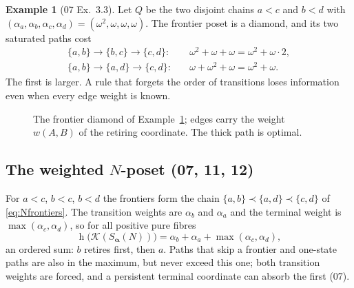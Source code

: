 \documentclass[11pt,a4paper]{article}
\theoremstyle{definition}
\newtheorem{example}[theorem]{Example}
\theoremstyle{remark}
\newcommand{\K}{\mathcal K}
\newcommand{\hgt}{\operatorname{h}}
\begin{document}
\begin{example}[07 Ex.~3.3]\label{nh:ex:diamond}
Let $Q$ be the two disjoint chains $a<c$ and $b<d$ with
$(\alpha_a,\alpha_b,\alpha_c,\alpha_d)=(\omega^2,\omega,\omega,\omega)$. The
frontier poset is a diamond, and its two saturated paths cost
\[
 \begin{aligned}
 \{a,b\}\to\{b,c\}\to\{c,d\}:&\quad \omega^2+\omega+\omega=\omega^2+\omega\cdot2,\\
 \{a,b\}\to\{a,d\}\to\{c,d\}:&\quad \omega+\omega^2+\omega=\omega^2+\omega .
 \end{aligned}
\]
The first is larger. A rule that forgets the order of transitions loses
information even when every edge weight is known.
\end{example}

\begin{figure}[htbp]
\centering
{}
\caption{The frontier diamond of Example~\ref{nh:ex:diamond}; edges carry the
weight $w(A,B)$ of the retiring coordinate. The thick path is optimal.}
\label{nh:fig:diamond}
\end{figure}

\subsection{The weighted \texorpdfstring{$N$}{N}-poset (07, 11, 12)}

For $a<c$, $b<c$, $b<d$ the frontiers form the chain
$\{a,b\}\prec\{a,d\}\prec\{c,d\}$ of \eqref{eq:Nfrontiers}. The transition
weights are $\alpha_b$ and $\alpha_a$ and the terminal weight is
$\max(\alpha_c,\alpha_d)$, so for all positive pure fibres
\begin{equation}\label{nh:eq:N}
 \boxed{\hgt\bigl(\K(S_{\boldsymbol\alpha}(N))\bigr)=\alpha_b+\alpha_a+\max(\alpha_c,\alpha_d),}
\end{equation}
an ordered sum: $b$ retires first, then $a$. Paths that skip a frontier and
one-state paths are also in the maximum, but never exceed this one; both
transition weights are forced, and a persistent terminal coordinate can absorb
the first (07).
\end{document}
